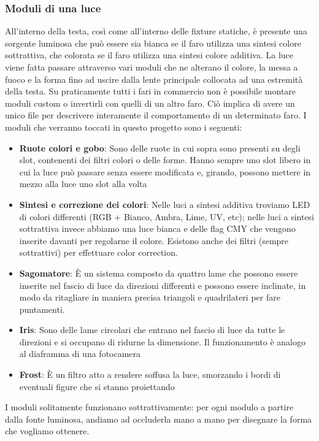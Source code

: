 \documentclass[main.tex]{subfiles}
\begin{document}
\subsubsection{Moduli di una luce}\label{subsec:1_1_modules}
All'interno della testa, così come all'interno delle fixture statiche, è presente una sorgente luminosa che può essere sia bianca se il faro utilizza una sintesi colore sottrattiva, che colorata se il faro utilizza una sintesi colore additiva. La luce viene fatta passare attraverso vari moduli che ne alterano il colore, la messa a fuoco e la forma fino ad uscire dalla lente principale collocata ad una estremità della testa. Su praticamente tutti i fari in commercio non è possibile montare moduli custom o invertirli con quelli di un altro faro. Ciò implica di avere un unico file per descrivere interamente il comportamento di un determinato faro. \newline
I moduli che verranno toccati in questo progetto sono i seguenti:
\begin{itemize}
    \item \textbf{Ruote colori e gobo}: Sono delle ruote in cui sopra sono presenti su degli slot, contenenti dei filtri colori o delle forme. Hanno sempre uno slot libero in cui la luce può passare senza essere modificata e, girando, possono mettere in mezzo alla luce uno slot alla volta
    \item \textbf{Sintesi e correzione dei colori}: Nelle luci a sintesi additiva troviamo LED di colori differenti (RGB + Bianco, Ambra, Lime, UV, etc); nelle luci a sintesi sottrattiva invece abbiamo una luce bianca e delle flag CMY che vengono inserite davanti per regolarne il colore. Esistono anche dei filtri (sempre sottrattivi) per effettuare color correction.
    \item \textbf{Sagomatore}: È un sistema composto da quattro lame che possono essere inserite nel fascio di luce da direzioni differenti e possono essere inclinate, in modo da ritagliare in maniera precisa triangoli e quadrilateri per fare puntamenti.
    \item \textbf{Iris}: Sono delle lame circolari che entrano nel fascio di luce da tutte le direzioni e si occupano di ridurne la dimensione. Il funzionamento è analogo al diaframma di una fotocamera
    \item \textbf{Frost}: È un filtro atto a rendere soffusa la luce, smorzando i bordi di eventuali figure che si stanno proiettando
\end{itemize}
I moduli solitamente funzionano sottrattivamente: per ogni modulo a partire dalla fonte luminosa, andiamo ad occluderla mano a mano per disegnare la forma che vogliamo ottenere.
\end{document}
